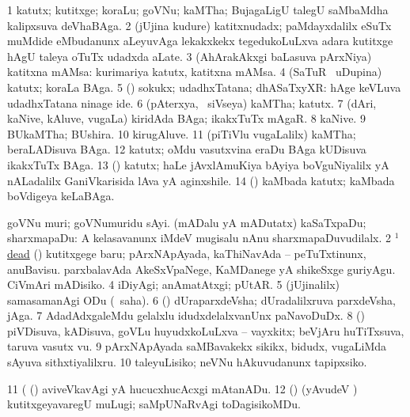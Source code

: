 \bentry
{}
\gl{\nA}
\bmng
\bnum
\num{1} katutx; kutitxge; koraLu; goVNu; kaMTha; BujagaLigU talegU saMbaMdha kalipxsuva deVhaBAga. 
\num{2} (jUjina kudure) katitxnudadx; paMdayxdalilx eSuTx muMdide eMbudanunx aLeyuvAga lekakxkekx tegedukoLuLxva adara kutitxge hAgU taleya oTuTx udadxda aLate. 
\num{3} (AhArakAkxgi baLasuva pArxNiya) katitxna mAMsa:  kurimariya katutx, katitxna mAMsa. 
\num{4} (SaTuR \mo\ uDupina) katutx; koraLa BAga. 
\num{5} (\ashi) sokukx; udadhxTatana; dhASaTxyXR:  hAge keVLuva udadhxTatana ninage ide. 
\num{6} (pAterxya, \kanmu\ siVseya) kaMTha; katutx. 
\num{7} (dAri, kaNive, kAluve, \mo vugaLa) kiridAda BAga; ikakxTuTx mAgaR. 
\num{8} kaNive. 
\num{9} BUkaMTha; BUshira. 
\num{10} kirugAluve. 
\num{11} (piTiVlu \mo vugaLalilx) kaMTha; beraLADisuva BAga. 
\num{12} katutx; oMdu vasutxvina eraDu BAga kUDisuva ikakxTuTx BAga. 
\num{13} (\BUvi) katutx; haLe jAvxlAmuKiya bAyiya boVguNiyalilx yA nALadalilx GaniVkarisida lAva yA aginxshile. 
\hypertarget{neck(1)14}{} 
\num{14} (\vAshi) kaMbada katutx; kaMbada boVdigeya keLaBAga. 
\enum
\emng

\noindent
\gl{\pagu}
\bmng
\bnum
{}  
\banum
{} goVNu muri; goVNumuridu sAyi. 
 (mADalu yA mADutatx) kaSaTxpaDu; sharxmapaDu:  A kelasavanunx iMdeV mugisalu nAnu sharxmapaDuvudilalx. 
\eanum
\numie
\num{2} \hyperref{kandict_d.pdf}{D}{dead(1) nuga(6)}{$^1$dead}  
  (\AmA) 
\banum
{} kutitxgege baru; pArxNApAyada, kaThiNavAda -- peTuTxtinunx, anuBavisu. 
 parxbalavAda AkeSxVpaNege, KaMDanege yA shikeSxge guriyAgu. 
 CiVmAri mADisiko. 
\eanum
\numie
\num{4}  iDiyAgi; anAmatAtxgi; pUtAR. 
\num{5}  (jUjinalilx) samasamanAgi ODu (\rUpa\ saha). 
\num{6}  (\AmA) dUraparxdeVsha; dUradalilxruva parxdeVsha, jAga. 
\num{7}  AdadAdxgaleMdu gelalxlu idudxdelalxvanUnx paNavoDuDx. 
\num{8}  (\AmA) piVDisuva, kADisuva, goVLu huyudxkoLuLxva -- vayxkitx; beVjAru huTiTxsuva, taruva vasutx \mo vu. 
\num{9}  pArxNApAyada saMBavakekx sikikx, bidudx, \mo vugaLiMda sAyuva sithxtiyalilxru. 
\num{10}  taleyuLisiko; neVNu hAkuvudanunx tapipxsiko. 
\num{11}  (  (\ashi) aviveVkavAgi yA hucucxhucAcxgi mAtanADu. 
\num{12}  (\AmA) (yAvudeV \vi) kutitxgeyavaregU muLugi; saMpUNaRvAgi toDagisikoMDu. 
\enum
\emng
\eentry

